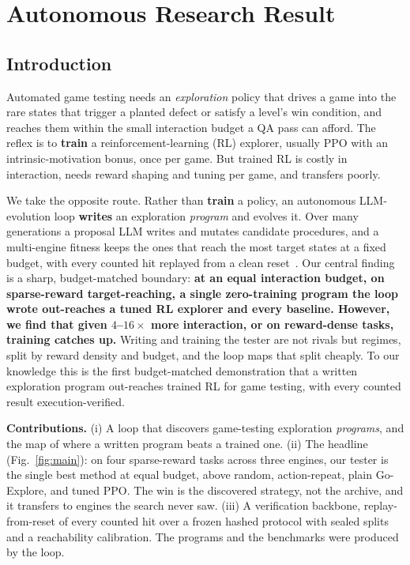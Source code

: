 \documentclass{article}
\begin{document}
\section{Autonomous Research Result}
\subsection{Introduction}
\label{sec:intro}
Automated game testing needs an \emph{exploration} policy that drives a game into the rare states that trigger a planted
defect or satisfy a level's win condition, and reaches them within the small interaction budget a QA pass can afford. The
reflex is to \textbf{train} a reinforcement-learning (RL) explorer, usually PPO with an intrinsic-motivation bonus, once
per game. But trained RL is costly in interaction, needs reward shaping and tuning per game, and transfers poorly.

We take the opposite route. Rather than \textbf{train} a policy, an autonomous LLM-evolution loop \textbf{writes} an
exploration \emph{program} and evolves it. Over many generations a proposal LLM writes and mutates candidate procedures,
and a multi-engine fitness keeps the ones that reach the most target states at a fixed budget, with every counted hit
replayed from a clean reset~\citep{funsearch}. Our central finding is a sharp, budget-matched boundary:
\textbf{at an equal interaction budget, on sparse-reward target-reaching, a single zero-training program the loop wrote
out-reaches a tuned RL explorer and every baseline. However, we find that given $4$--$16\times$ more interaction, or on reward-dense tasks,
training catches up.} Writing and training the tester are not rivals but regimes, split by reward density and budget, and
the loop maps that split cheaply. To our knowledge this is the first budget-matched demonstration that a written
exploration program out-reaches trained RL for game testing, with every counted result execution-verified.

\textbf{Contributions.} (i) A loop that discovers game-testing exploration \emph{programs}, and the map of where a written
program beats a trained one. (ii) The headline (Fig.~\ref{fig:main}): on four sparse-reward tasks across three engines, our
tester is the single best method at equal budget, above random, action-repeat, plain Go-Explore, and tuned PPO. The win is
the discovered strategy, not the archive, and it transfers to engines the search never saw. (iii) A verification backbone,
replay-from-reset of every counted hit over a frozen hashed protocol with sealed splits and a reachability calibration. The programs and the benchmarks were produced by the loop.
\end{document}
